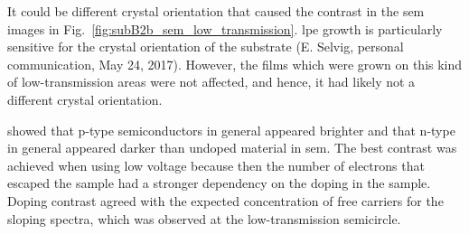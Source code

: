 It could be different crystal orientation that caused the contrast in the \ac{sem} images in Fig.~\ref{fig:subB2b_sem_low_transmission}. \Ac{lpe} growth is particularly sensitive for the crystal orientation of the substrate (E. Selvig, personal communication, May 24, 2017). However, the films which were grown on this kind of low-transmission areas were not affected, and hence, it had likely not a different crystal orientation. 

\citet{sealy2000mechanism} showed that p-type semiconductors in general appeared brighter and that n-type in general appeared darker than undoped material in \ac{sem}. The best contrast was achieved when using low voltage because then the number of electrons that escaped the sample had a stronger dependency on the doping in the sample. Doping contrast agreed with the expected concentration of free carriers for the sloping spectra, which was observed at the low-transmission semicircle.

